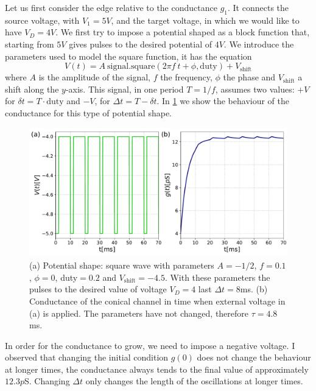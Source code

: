 \documentclass[10.5pt]{article}
\begin{document}
Let us first consider the edge relative to the conductance $g_1$. It connects the source voltage, with $V_1 = 5V$, and the target voltage, in which we would like to have $V_D = 4V$. We first try to impose a potential shaped as a block function that, starting from $5V$ gives pulses to the desired potential of $4V$. We introduce the parameters used to model the square function, it has the equation
\[
V(t) = A  \ \text{signal.square}\left( 2\pi f \ t + \phi , \text{duty} \right) + V_{\text{shift}}
\]
where $A$ is the amplitude of the signal, $f$ the frequency, $\phi$ the phase and $V_{\text{shift}}$ a shift along the $y$-axis. This signal, in one period $T = 1/f$, assumes two values: $+V$ for $\delta t = T \cdot \text{duty}$ and $-V$, for $\Delta t = T - \delta t$. In \cref{fig:memtrain_volt_gsol} we show the behaviour of the conductance for this type of potential shape.
\begin{figure}[h]
    \centering
    \includegraphics[width=0.7\columnwidth]{../figures_tex/memtrain_volt_gsol.pdf}
    \caption{(a) Potential shape: square wave with parameters $A=-1/2$, $f = 0.1$, $\phi=0$, duty$=0.2$ and $V_{\text{shift}}=-4.5$. With these parameters the pulses to the desired value of voltage $V_D=4$ last $\Delta t = 8$ms. (b) Conductance of the conical channel in time when external voltage in (a) is applied. The parameters have not changed, therefore $\tau = 4.8$ms.}
    \label{fig:memtrain_volt_gsol}
\end{figure}
In order for the conductance to grow, we need to impose a negative voltage. I observed that changing the initial condition $g(0)$ does not change the behaviour at longer times, the conductance always tends to the final value of approximately $12.3p$S. Changing $\Delta t$ only changes the length of the oscillations at longer times. 
\end{document}

